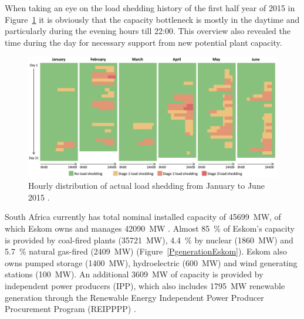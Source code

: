When taking an eye on the load shedding history of the first half year of 2015 in Figure~\ref{Load_shedding} it is obviously that the capacity bottleneck is mostly in the daytime and particularly during the evening hours till 22:00. This overview also revealed the time during the day for necessary support from new potential plant capacity.

\begin{figure}[htbp]  
\centering
\includegraphics[width=1\linewidth]{FIG/Load_shedding}
\caption[Hourly distribution of actual load shedding from January to June 2015.]{Hourly distribution of actual load shedding from January to June 2015 \cite{CSIREnergyCentre2015}.}\label{Load_shedding}
\end{figure}


South Africa currently has total nominal installed capacity of \SI{45699}{\mega\watt}, of which Eskom owns and manages \SI{42090}{\mega\watt} \cite{Eskom2015b}. Almost \SI{85}{\percent} of Eskom's capacity is provided by coal-fired plants (\SI{35721}{\mega\watt}), \SI{4.4}{\percent} by nuclear (\SI{1860}{\mega\watt}) and \SI{5.7}{\percent} natural gas-fired (\SI{2409}{\mega\watt}) (Figure~\ref{PgenerationEskom}). Eskom also owns pumped storage (\SI{1400}{\mega\watt}), hydroelectric (\SI{600}{\mega\watt}) and wind generating stations (\SI{100}{\mega\watt}). An additional \SI{3609}{\mega\watt} of capacity is provided by independent power producers (IPP), which also includes \SI{1795}{\mega\watt} renewable generation through the Renewable Energy Independent Power Producer Procurement Program (REIPPPP) \cite{Eskom2015a}.

